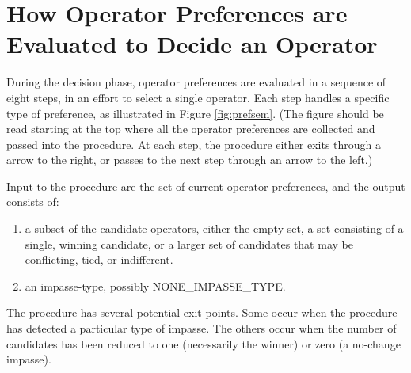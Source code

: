 \chapter{How Operator Preferences are Evaluated to Decide an Operator}
\label{PREFERENCES}


During the decision phase, operator preferences are evaluated in a sequence 
of eight steps, in an effort to select a single operator. 
Each step handles a specific type of preference, as illustrated in Figure 
\ref{fig:prefsem}. (The figure should be read starting at the top
where all the operator preferences are collected and passed into the procedure. At
each step, the procedure either exits through a arrow to the right, or passes to 
the next step through an arrow to the left.)

Input to the procedure are the set of current operator preferences, and the output
consists of:
\begin{enumerate}
\item a subset of the candidate operators, either the empty set, a set consisting of a single, 
winning candidate, or a larger set of candidates that may be conflicting,
tied, or indifferent.
\item an impasse-type, possibly NONE\_IMPASSE\_TYPE.
\end{enumerate}
The procedure has several potential exit points. Some occur when the procedure
has detected a particular type of impasse. The others occur when the number of
candidates has been reduced to 
one (necessarily the winner) or zero (a no-change impasse).

